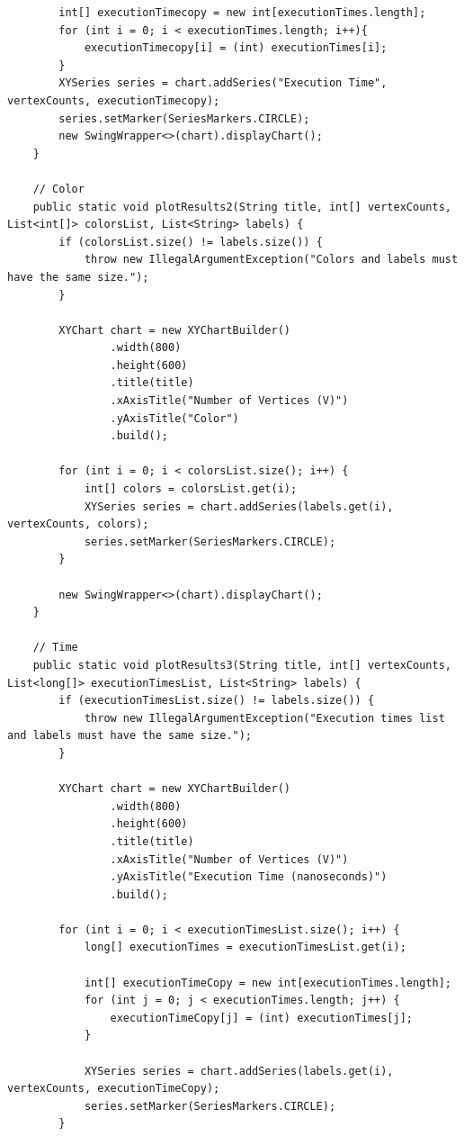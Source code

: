 \documentclass{article}
\begin{document}
\begin{verbatim}
        int[] executionTimecopy = new int[executionTimes.length];
        for (int i = 0; i < executionTimes.length; i++){
            executionTimecopy[i] = (int) executionTimes[i];
        }
        XYSeries series = chart.addSeries("Execution Time", vertexCounts, executionTimecopy);
        series.setMarker(SeriesMarkers.CIRCLE);
        new SwingWrapper<>(chart).displayChart();
    }

    // Color
    public static void plotResults2(String title, int[] vertexCounts, List<int[]> colorsList, List<String> labels) {
        if (colorsList.size() != labels.size()) {
            throw new IllegalArgumentException("Colors and labels must have the same size.");
        }

        XYChart chart = new XYChartBuilder()
                .width(800)
                .height(600)
                .title(title)
                .xAxisTitle("Number of Vertices (V)")
                .yAxisTitle("Color")
                .build();

        for (int i = 0; i < colorsList.size(); i++) {
            int[] colors = colorsList.get(i);
            XYSeries series = chart.addSeries(labels.get(i), vertexCounts, colors);
            series.setMarker(SeriesMarkers.CIRCLE);
        }

        new SwingWrapper<>(chart).displayChart();
    }

    // Time
    public static void plotResults3(String title, int[] vertexCounts, List<long[]> executionTimesList, List<String> labels) {
        if (executionTimesList.size() != labels.size()) {
            throw new IllegalArgumentException("Execution times list and labels must have the same size.");
        }

        XYChart chart = new XYChartBuilder()
                .width(800)
                .height(600)
                .title(title)
                .xAxisTitle("Number of Vertices (V)")
                .yAxisTitle("Execution Time (nanoseconds)")
                .build();

        for (int i = 0; i < executionTimesList.size(); i++) {
            long[] executionTimes = executionTimesList.get(i);

            int[] executionTimeCopy = new int[executionTimes.length];
            for (int j = 0; j < executionTimes.length; j++) {
                executionTimeCopy[j] = (int) executionTimes[j];
            }

            XYSeries series = chart.addSeries(labels.get(i), vertexCounts, executionTimeCopy);
            series.setMarker(SeriesMarkers.CIRCLE);
        }


\end{verbatim}
\end{document}
